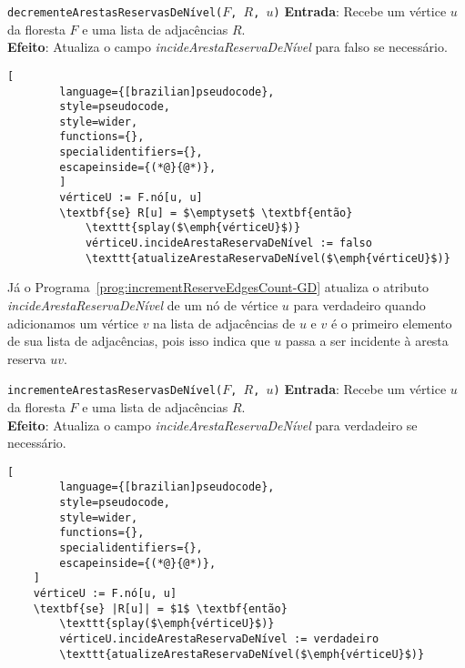 \begin{programruledcaption}{\texttt{decrementeArestasReservasDeNível($F$, $R$, $u$)} \label{prog:decrementReserveEdgesCount-GD}}
    \noindent\textbf{Entrada}: Recebe um vértice $u$ da floresta $F$ e uma lista de adjacências $R$.\\
    \noindent\textbf{Efeito}: Atualiza o campo \textit{incideArestaReservaDeNível} para falso se necessário.
    \vspace{-0.5\baselineskip}
    \begin{lstlisting}[
        language={[brazilian]pseudocode},
        style=pseudocode,
        style=wider,
        functions={},
        specialidentifiers={},
        escapeinside={(*@}{@*)},
        ]
        vérticeU := F.nó[u, u]
        \textbf{se} R[u] = $\emptyset$ \textbf{então}
            \texttt{splay($\emph{vérticeU}$)} 
            vérticeU.incideArestaReservaDeNível := falso
            \texttt{atualizeArestaReservaDeNível($\emph{vérticeU}$)}
    \end{lstlisting}
    \vspace{-0.5\baselineskip}
\end{programruledcaption}

Já o Programa~\ref{prog:incrementReserveEdgesCount-GD} atualiza o atributo \textit{incideArestaReservaDeNível} de um nó de vértice $u$ para verdadeiro quando adicionamos um vértice $v$ na lista de adjacências de $u$ e $v$ é o primeiro elemento de sua lista de adjacências, pois isso indica que $u$ passa a ser incidente à aresta reserva $uv$.

\begin{programruledcaption}{\texttt{incrementeArestasReservasDeNível($F$, $R$, $u$)} \label{prog:incrementReserveEdgesCount-GD}}
    \noindent\textbf{Entrada}: Recebe um vértice $u$ da floresta $F$ e uma lista de adjacências $R$.\\
    \noindent\textbf{Efeito}: Atualiza o campo \textit{incideArestaReservaDeNível} para verdadeiro se necessário.
    \vspace{-0.5\baselineskip}
    \begin{lstlisting}[
        language={[brazilian]pseudocode},
        style=pseudocode,
        style=wider,
        functions={},
        specialidentifiers={},
        escapeinside={(*@}{@*)},
    ]
    vérticeU := F.nó[u, u]
    \textbf{se} |R[u]| = $1$ \textbf{então}
        \texttt{splay($\emph{vérticeU}$)}
        vérticeU.incideArestaReservaDeNível := verdadeiro
        \texttt{atualizeArestaReservaDeNível($\emph{vérticeU}$)}
    \end{lstlisting}
    \vspace{-0.5\baselineskip}
\end{programruledcaption} 

